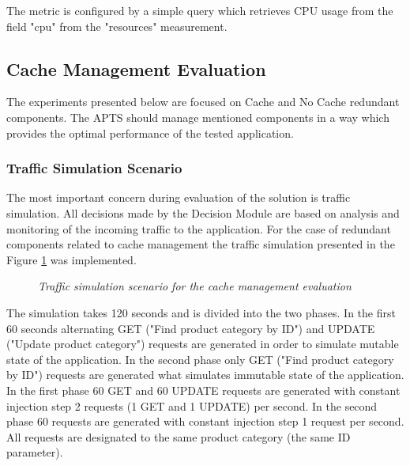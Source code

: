 \documentclass[12pt,a4paper]{article}
\begin{document}
The metric is configured by a simple query which retrieves CPU usage from the field "cpu" from the "resources" measurement.  

\subsection{Cache Management Evaluation} \label{section:cachemenagementevaluation}

The experiments presented below are focused on Cache and No Cache redundant components. The APTS should manage mentioned components in a way which provides the optimal performance of the tested application.

\subsubsection{Traffic Simulation Scenario} \label{trafficcachesim}

The most important concern during evaluation of the solution is traffic simulation. All decisions made by the Decision Module are based on analysis and monitoring of the incoming traffic to the application. For the case of redundant components related to cache management the traffic simulation presented in the Figure \ref{trafficcache} was implemented.

\begin{figure}[!htb]
\begin{center}
\end{center}
\caption{\textit{Traffic simulation scenario for the cache management evaluation}} \label{trafficcache}
\end{figure}

The simulation takes 120 seconds and is divided into the two phases. In the first 60 seconds alternating GET ("Find product category by ID") and UPDATE ("Update product category") requests are generated in order to simulate mutable state of the application. In the second phase only GET ("Find product category by ID") requests are generated what simulates immutable state of the application. In the first phase 60 GET and 60 UPDATE requests are generated with constant injection step 2 requests (1 GET and 1 UPDATE) per second. In the second phase 60 requests are generated with constant injection step 1 request per second. All requests are designated to the same product category (the same ID parameter). 
\end{document}
